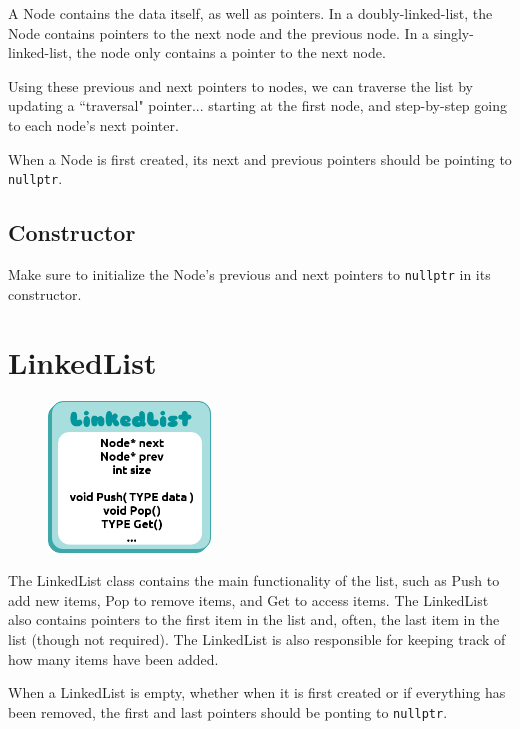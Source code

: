\documentclass[a4paper,12pt,oneside]{book}
\begin{document}
        A Node contains the data itself, as well as pointers. In a doubly-linked-list, 
        the Node contains pointers to the next node and the previous node.
        In a singly-linked-list, the node only contains a pointer to the next node.

        Using these previous and next pointers to nodes, we can traverse the list by updating 
        a ``traversal" pointer... starting at the first node, and step-by-step going 
        to each node's next pointer.
        
        When a Node is first created, its next and previous pointers should
        be pointing to \texttt{nullptr}.
        
        \subsection{Constructor}
        
        Make sure to initialize the Node's previous and next pointers to
        \texttt{nullptr} in its constructor.
    
    \section{LinkedList}
        
        \begin{figure}
        \includegraphics[height=4cm]{images/justalist.png}
        \end{figure}
        
        The LinkedList class contains the main functionality of the list,
        such as Push to add new items, Pop to remove items, and Get to access items.
        The LinkedList also contains pointers to the first item in the list and,
        often, the last item in the list (though not required).
        The LinkedList is also responsible for keeping track of how many items
        have been added.

        When a LinkedList is empty, whether when it is first created or if everything
        has been removed, the first and last pointers should be ponting to
        \texttt{nullptr}.
        
\end{document}
